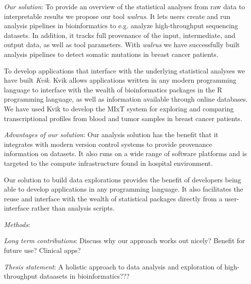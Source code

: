 \emph{Our solution}: 
To provide an overview of the statistical analyses from raw data to
interpretable results we propose our tool \emph{walrus}. It lets users create
and run analysis pipelines in bioinformatics to e.g. analyze high-throughput
sequencing datasets. In addition, it tracks full provenance of the input,
intermediate, and output data, as well as tool parameters. With \emph{walrus} we
have successfully built analysis pipelines to detect somatic mutations in breast
cancer patients. 

To develop applications that interface with the underlying statistical analyses
we have built \emph{Kvik}. Kvik allows applications written in any modern
programming language to interface with the wealth of bioinformatics packages in
the R programming language, as well as information available through online
databases. We have used Kvik to develop the MIxT system for exploring and
comparing transcriptional profiles from blood and tumor samples in breast cancer
patients. 

\emph{Advantages of our solution}:
Our analysis solution has the benefit that it integrates with modern version
control systems to provide provenance information on datasets. It also runs on a
wide range of software platforms and is targeted to the compute infrastructure
found in hospital environment. 

Our solution to build data explorations provides the benefit of developers being
able to develop applications in any programming language. It also facilitates
the reuse and interface with the wealth of statistical packages directly from a
user-interface rather than analysis scripts. 

\emph{Methods}:

\emph{Long term contributions}:
Discuss why our approach works out nicely? Benefit for future use? Clinical
apps? 

\emph{Thesis statement}:
A holistic approach to data analysis and exploration of high-throughput
dataasets in bioinformatics??? 


